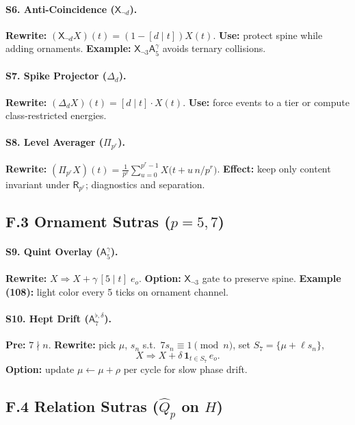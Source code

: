 \documentclass[12pt]{article}
\numberwithin{equation}{section}
\theoremstyle{plain}
\theoremstyle{definition}
\theoremstyle{remark}
\begin{document}
\paragraph{S6. Anti-Coincidence ($\mathsf{X}_{\neg d}$).}
\textbf{Rewrite:} $(\mathsf{X}_{\neg d}X)(t)=(1-[d\mid t])X(t)$.
\textbf{Use:} protect spine while adding ornaments.
\textbf{Example:} $\mathsf{X}_{\neg 3}\mathsf{A}_5^{\gamma}$ avoids ternary collisions.

\paragraph{S7. Spike Projector ($\Delta_{d}$).}
\textbf{Rewrite:} $(\Delta_{d}X)(t)=[d\mid t]\cdot X(t)$.
\textbf{Use:} force events to a tier or compute class-restricted energies.

\paragraph{S8. Level Averager ($\Pi_{p^r}$).}
\textbf{Rewrite:} $(\Pi_{p^r}X)(t)=\frac{1}{p^r}\sum_{u=0}^{p^r-1} X\!\big(t+u\,n/p^r\big)$.
\textbf{Effect:} keep only content invariant under $\mathsf{R}_{p^r}$; diagnostics and separation.

\subsection*{F.3 Ornament Sutras ($p=5,7$)}
\paragraph{S9. Quint Overlay ($\mathsf{A}_5^{\gamma}$).}
\textbf{Rewrite:} $X\Rightarrow X+\gamma\,[5\mid t]\;e_o$.
\textbf{Option:} $\mathsf{X}_{\neg 3}$ gate to preserve spine.
\textbf{Example (108):} light color every 5 ticks on ornament channel.

\paragraph{S10. Hept Drift ($\mathsf{A}_7^{\flat,\delta}$).}
\textbf{Pre:} $7\nmid n$.
\textbf{Rewrite:} pick $\mu$, $s_n$ s.t.\ $7s_n\equiv1\pmod n$, set $S_7=\{\mu+\ell s_n\}$,
\[
X\Rightarrow X+\delta\,\mathbf{1}_{t\in S_7}\,e_o.
\]
\textbf{Option:} update $\mu\leftarrow \mu+\rho$ per cycle for slow phase drift.

\subsection*{F.4 Relation Sutras ($\hat{Q}_p$ on $H$)}
\end{document}
